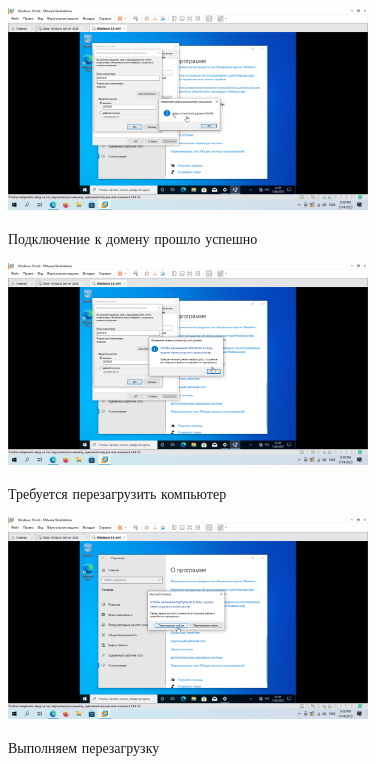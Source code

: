 \documentclass[a4paper]{article}
\begin{document}
  \begin{figure}[H]
    \centering
    \includegraphics[width=0.85\textwidth]{5_0089}
    \label{img:89}
    \caption{Подключение к домену прошло успешно}
  \end{figure}

  \begin{figure}[H]
    \centering
    \includegraphics[width=0.85\textwidth]{5_0090}
    \label{img:90}
    \caption{Требуется перезагрузить компьютер}
  \end{figure}

  \begin{figure}[H]
    \centering
    \includegraphics[width=0.85\textwidth]{5_0091}
    \label{img:91}
    \caption{Выполняем перезагрузку}
  \end{figure}
\end{document}
